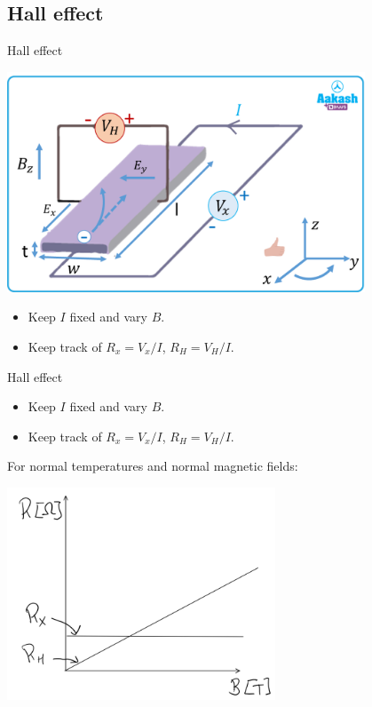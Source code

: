 \documentclass{beamer}
\begin{document}
\subsection{Hall effect}

\begin{frame}{Hall effect}
	\begin{center}
		\includegraphics[width=0.8\textwidth]{Images/HallEffect.png}
	\end{center}
	\pause
	\begin{itemize}
		\item Keep $I$ fixed and vary $B$.
		\item Keep track of $R_x=V_x/I$, $R_H=V_H/I$.
	\end{itemize}
\end{frame}

\begin{frame}{Hall effect}
	\begin{itemize}
		\item Keep $I$ fixed and vary $B$.
		\item Keep track of $R_x=V_x/I$, $R_H=V_H/I$.
	\end{itemize}
	\pause
	 For normal temperatures and normal magnetic fields:
	\begin{center}
		\includegraphics[width=0.6\textwidth]{Images/ClassicalHallResistance.png}
	\end{center}
\end{frame}
\end{document}
